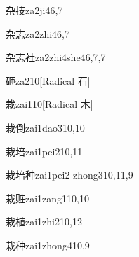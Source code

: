 
\begin{verbete}{杂技}{za2ji4}{6,7}
\end{verbete}

\begin{verbete}{杂志}{za2zhi4}{6,7}
\end{verbete}

\begin{verbete}{杂志社}{za2zhi4she4}{6,7,7}
\end{verbete}

\begin{verbete}{砸}{za2}{10}[Radical 石]
\end{verbete}

\begin{verbete}{栽}{zai1}{10}[Radical 木]
\end{verbete}

\begin{verbete}{栽倒}{zai1dao3}{10,10}
\end{verbete}

\begin{verbete}{栽培}{zai1pei2}{10,11}
\end{verbete}

\begin{verbete}{栽培种}{zai1pei2 zhong3}{10,11,9}
\end{verbete}

\begin{verbete}{栽赃}{zai1zang1}{10,10}
\end{verbete}

\begin{verbete}{栽植}{zai1zhi2}{10,12}
\end{verbete}

\begin{verbete}{栽种}{zai1zhong4}{10,9}
\end{verbete}

